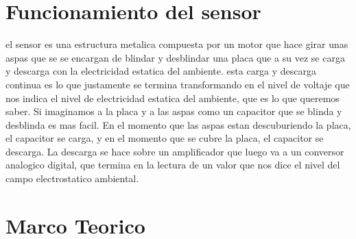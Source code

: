 \section{Funcionamiento del sensor} %
\label{sec:funcionamiento_del_sensor}
el sensor es una estructura metalica compuesta por un motor que hace girar unas aspas que se se encargan de blindar y desblindar una placa que a su vez se carga y descarga con la electricidad estatica del ambiente. esta carga y descarga continua es lo que justamente se termina transformando en el nivel de voltaje que nos indica el nivel de electricidad estatica del ambiente, que es lo que queremos saber. Si imaginamos a la placa y a las aspas como un capacitor que se blinda y desblinda es mas facil. En el momento que las aspas estan descuburiendo la placa, el capacitor se carga, y en el momento que se cubre la placa, el capacitor se descarga. La descarga se hace sobre un amplificador que luego va a un conversor analogico digital, que termina en la lectura de un valor que nos dice el nivel del campo electrostatico ambiental.



\section{Marco Teorico} %
\label{sec:marco_teorico}


